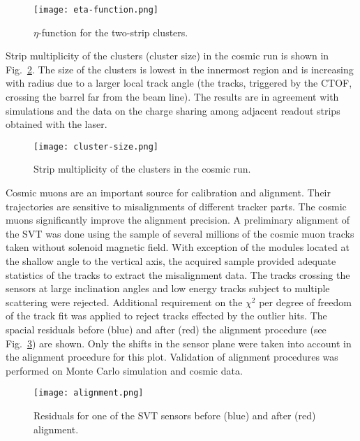 \begin{figure}[hbt] 
\centering 
\texttt{[image: eta-function.png]}
\caption{$\eta$-function for the two-strip clusters.}
\label{fig:eta-function}
\end{figure}

Strip multiplicity of the clusters (cluster size) in the cosmic run is shown in Fig.~\ref{fig:cluster-size}. The size of the clusters is lowest in the innermost region and is increasing with radius due to a larger local track angle (the tracks, triggered by the CTOF, crossing the barrel far from the beam line). The results are in agreement with simulations and the data on the charge sharing among adjacent readout strips obtained with the laser.

\begin{figure}[hbt] 
\centering 
\texttt{[image: cluster-size.png]}
\caption{Strip multiplicity of the clusters in the cosmic run.}
\label{fig:cluster-size}
\end{figure}

Cosmic muons are an important source for calibration and alignment. Their trajectories are sensitive to misalignments of different tracker parts. The cosmic muons significantly improve the alignment precision. A preliminary alignment of the SVT was done using the sample of several millions of the cosmic muon tracks taken without solenoid magnetic field. With exception of the modules located at the shallow angle to the vertical axis, the acquired sample provided adequate statistics of the tracks to extract the misalignment data. The tracks crossing the sensors at large inclination angles and low energy tracks subject to multiple scattering were rejected. Additional requirement on the $\chi^2$ per degree of freedom of the track fit was applied to reject tracks effected by the outlier hits. The spacial residuals before (blue) and after (red) the alignment procedure (see Fig.~\ref{fig:alignment}) are shown. Only the shifts in the sensor plane were taken into account in the alignment procedure for this plot. Validation of alignment procedures was performed on Monte Carlo simulation and cosmic data.

\begin{figure}[hbt] 
\centering 
\texttt{[image: alignment.png]}
\caption{Residuals for one of the SVT sensors before (blue) and after (red) alignment.}
\label{fig:alignment}
\end{figure}

